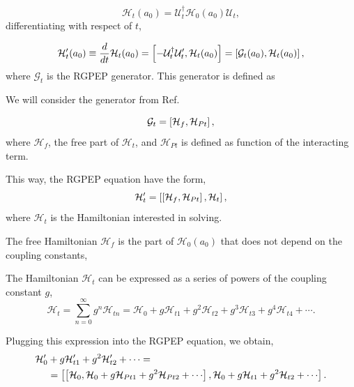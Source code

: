 \documentclass[11pt,a4paper,twoside,pdf]{article}
\numberwithin{equation}{section}
\begin{document}
\begin{equation}
    \mathcal{H}_t(a_0) = \mathcal{U}_t^\dagger\mathcal{H}_0(a_0) \mathcal{U}_t,
\end{equation}
differentiating with respect of $t$, 

\begin{equation}
    \mathcal{H}_t^\prime (a_0) \equiv \frac{d}{dt}\mathcal{H}_t(a_0) = 
    \left[ -\mathcal{U}_t^\dagger \mathcal{U}_t^\prime, \mathcal{H}_t(a_0) \right] 
    = \left[ \mathcal{G}_t(a_0), \mathcal{H}_t(a_0) \right],
\end{equation}
where $\mathcal{G}_t$ is the RGPEP generator. This generator is defined as 

We will consider the generator from Ref. \cite{PEP}

\begin{equation}
    \mathcal{G}_t = \left[ \mathcal{H}_f, \mathcal{H}_{Pt} \right],
\end{equation}
where $\mathcal{H}_f$, the free part of $\mathcal{H}_t$, and $\mathcal{H}_{Pt}$ is 
defined as function of the interacting term. 

This way, the RGPEP equation have the form,
\begin{equation}
    \mathcal{H}_t^\prime =  \left[ \left[ \mathcal{H}_f, \mathcal{H}_{Pt} \right], \mathcal{H}_t \right],
\end{equation}
where $\mathcal{H}_t$ is the Hamiltonian interested in solving.

The free Hamiltonian $\mathcal{H}_f$ is the part of $\mathcal{H}_0(a_0)$ that does 
not depend on the coupling constants, 


The Hamiltonian $\mathcal{H}_t$ can be expressed as a series of powers of the coupling 
constant $g$,
\begin{equation}
    \mathcal{H}_t = \sum_{n=0}^{\infty} g^n \mathcal{H}_{t n} = 
    \mathcal{H}_{0} + g \mathcal{H}_{t 1} + g^2 \mathcal{H}_{t 2} + g^3 \mathcal{H}_{t 3} +
    g^4 \mathcal{H}_{t 4} + \cdots.
\end{equation}

Plugging this expression into the RGPEP equation, we obtain,
\begin{align}
    \begin{split}
    \mathcal{H}_{0}^\prime & + g \mathcal{H}_{t 1}^\prime  + g^2 \mathcal{H}_{t 2}^\prime
     + \cdots =  \\
     &= \sbrackets{\sbrackets{\mathcal{H}_0, \mathcal{H}_{0} + g \mathcal{H}_{Pt 1} 
     + g^2 \mathcal{H}_{Pt 2} + \cdots}, \mathcal{H}_{0} + g \mathcal{H}_{t 1} + g^2 \mathcal{H}_{t 2} + \cdots}. 
    \end{split}
\end{align}
\end{document}
